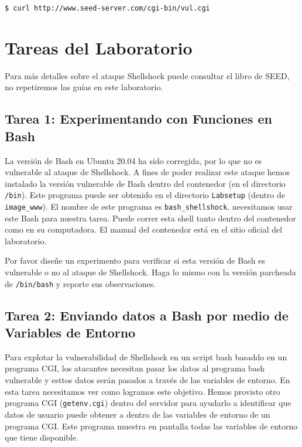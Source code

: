\begin{lstlisting}
$ curl http://www.seed-server.com/cgi-bin/vul.cgi
\end{lstlisting}


\section{Tareas del Laboratorio}

Para más detalles sobre el ataque Shellshock puede consultar el libro de SEED, no repetiremos las guías en este laboratorio.

\subsection{Tarea 1: Experimentando con Funciones en Bash}

La versión de Bash en Ubuntu 20.04 ha sido corregida, por lo que no es vulnerable al ataque de Shellshock. A fines de poder realizar este ataque hemos instalado la versión vulnerable de Bash dentro del contenedor (en el directorio  \texttt{/bin}). 
Este programa puede ser obtenido en el directorio \texttt{Labsetup} (dentro de \texttt{image\_www}). 
El nombre de este programa es \texttt{bash\_shellshock}. necesitamos usar este Bash para nuestra tarea. Puede correr esta shell tanto dentro del contenedor como en su computadora.
El manual del contenedor está en el sitio oficial del laboratorio.

Por favor diseñe un experimento para verificar si esta versión de Bash es vulnerable o no al ataque de Shellshock. Haga lo mismo con la versión parcheada de \texttt{/bin/bash} y reporte sus observaciones.


\subsection{Tarea 2: Enviando datos a Bash por medio de Variables de Entorno}

Para explotar la vulnerabilidad de Shellshock en un script bash basaddo en un programa CGI, los atacantes necesitan pasar los datos al programa bash vulnerable y esttos datos serán pasados a través de las variables de entorno. En esta tarea necesitamos ver como logramos este objetivo. Hemos provisto otro programa CGI (\texttt{getenv.cgi}) dentro del servidor para ayudarlo a identificar que datos de usuario puede obtener a dentro de las variables de entorno de un programa CGI. Este programa muestra en pantalla todas las variables de entorno que tiene disponible.


